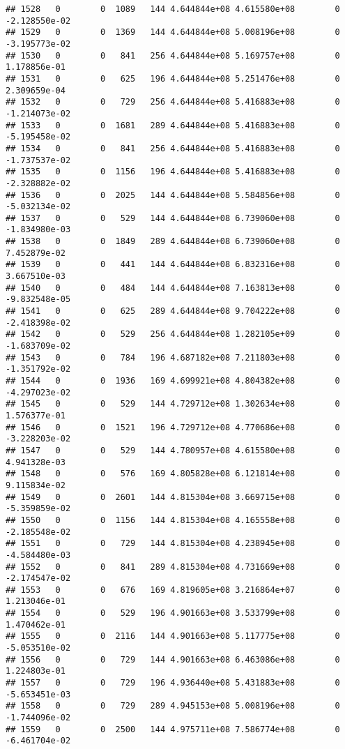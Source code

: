 \documentclass[
]{article}
\begin{document}
\begin{enumerate}
\begin{verbatim}
## 1528   0        0  1089   144 4.644844e+08 4.615580e+08        0 -2.128550e-02
## 1529   0        0  1369   144 4.644844e+08 5.008196e+08        0 -3.195773e-02
## 1530   0        0   841   256 4.644844e+08 5.169757e+08        0  1.178856e-01
## 1531   0        0   625   196 4.644844e+08 5.251476e+08        0  2.309659e-04
## 1532   0        0   729   256 4.644844e+08 5.416883e+08        0 -1.214073e-02
## 1533   0        0  1681   289 4.644844e+08 5.416883e+08        0 -5.195458e-02
## 1534   0        0   841   256 4.644844e+08 5.416883e+08        0 -1.737537e-02
## 1535   0        0  1156   196 4.644844e+08 5.416883e+08        0 -2.328882e-02
## 1536   0        0  2025   144 4.644844e+08 5.584856e+08        0 -5.032134e-02
## 1537   0        0   529   144 4.644844e+08 6.739060e+08        0 -1.834980e-03
## 1538   0        0  1849   289 4.644844e+08 6.739060e+08        0  7.452879e-02
## 1539   0        0   441   144 4.644844e+08 6.832316e+08        0  3.667510e-03
## 1540   0        0   484   144 4.644844e+08 7.163813e+08        0 -9.832548e-05
## 1541   0        0   625   289 4.644844e+08 9.704222e+08        0 -2.418398e-02
## 1542   0        0   529   256 4.644844e+08 1.282105e+09        0 -1.683709e-02
## 1543   0        0   784   196 4.687182e+08 7.211803e+08        0 -1.351792e-02
## 1544   0        0  1936   169 4.699921e+08 4.804382e+08        0 -4.297023e-02
## 1545   0        0   529   144 4.729712e+08 1.302634e+08        0  1.576377e-01
## 1546   0        0  1521   196 4.729712e+08 4.770686e+08        0 -3.228203e-02
## 1547   0        0   529   144 4.780957e+08 4.615580e+08        0  4.941328e-03
## 1548   0        0   576   169 4.805828e+08 6.121814e+08        0  9.115834e-02
## 1549   0        0  2601   144 4.815304e+08 3.669715e+08        0 -5.359859e-02
## 1550   0        0  1156   144 4.815304e+08 4.165558e+08        0 -2.185548e-02
## 1551   0        0   729   144 4.815304e+08 4.238945e+08        0 -4.584480e-03
## 1552   0        0   841   289 4.815304e+08 4.731669e+08        0 -2.174547e-02
## 1553   0        0   676   169 4.819605e+08 3.216864e+07        0  1.213046e-01
## 1554   0        0   529   196 4.901663e+08 3.533799e+08        0  1.470462e-01
## 1555   0        0  2116   144 4.901663e+08 5.117775e+08        0 -5.053510e-02
## 1556   0        0   729   144 4.901663e+08 6.463086e+08        0  1.224803e-01
## 1557   0        0   729   196 4.936440e+08 5.431883e+08        0 -5.653451e-03
## 1558   0        0   729   289 4.945153e+08 5.008196e+08        0 -1.744096e-02
## 1559   0        0  2500   144 4.975711e+08 7.586774e+08        0 -6.461704e-02

\end{verbatim}
\end{enumerate}
\end{document}
